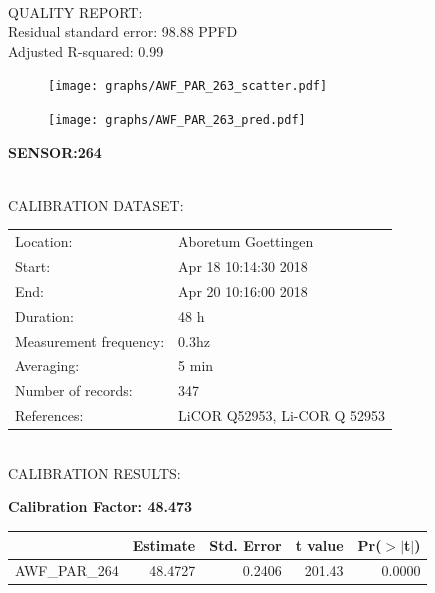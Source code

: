 \documentclass[oneside]{report}
\begin{document}
\hrulefill\\
QUALITY REPORT:\\
Residual standard error: 98.88 PPFD\\
Adjusted R-squared: 0.99



\begin{figure}[H]
  \centering
  \texttt{[image: graphs/AWF\_PAR\_263\_scatter.pdf]}
\end{figure}




\begin{figure}[H]
  \centering
  \texttt{[image: graphs/AWF\_PAR\_263\_pred.pdf]}
\end{figure}

\pagebreak


\begin{center}
\large{\textbf{SENSOR:264}}\\
\end{center}

\hrulefill\\
CALIBRATION DATASET:\\
\begin{table}[h!]
  \centering
  \label{tab:table1}
  \begin{tabular}{ll}
    Location: & Aboretum Goettingen\\ 
    
    
    Start:  & Apr 18 10:14:30 2018 \\
    End:   & Apr 20 10:16:00 2018\\ 
    Duration: & 48 h\\
    Measurement frequency: & 0.3hz\\
    Averaging:  &5 min\\
    Number of records: & 347 \\
    References: & LiCOR Q52953, Li-COR Q 52953 \\
  \end{tabular}
\end{table}

\hrulefill\\
CALIBRATION RESULTS:\\


\begin{center}
\textbf{\large{Calibration Factor: 48.473}}\\
\end{center}
\begin{table}[ht]
\centering
\begin{tabular}{rrrrr}
  \hline
 & Estimate & Std. Error & t value & Pr($>$$|$t$|$) \\ 
  \hline
AWF\_PAR\_264 & 48.4727 & 0.2406 & 201.43 & 0.0000 \\ 
   \hline
\end{tabular}
\end{table}
\end{document}
